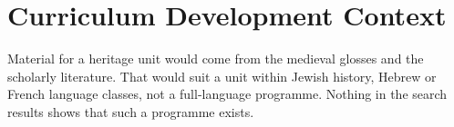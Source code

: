 \documentclass[12pt]{article}
\begin{document}
\section{Curriculum Development Context}
Material for a heritage unit would come from the medieval glosses and the scholarly literature. That would suit a unit within Jewish history, Hebrew or French language classes, not a full-language programme. Nothing in the search results shows that such a programme exists.
\end{document}
